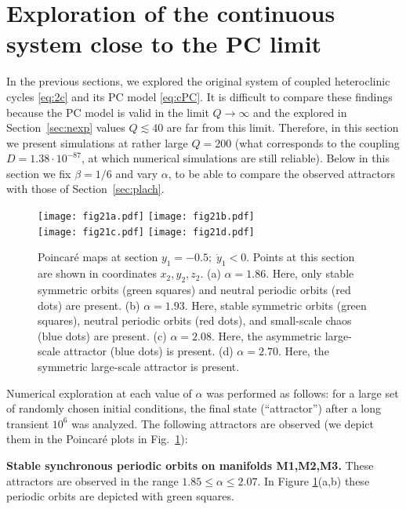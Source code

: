 \documentclass[3p,number,review,sort&compress]{elsarticle}
\begin{document}
\section{Exploration of the continuous system close to the PC limit}
\label{sec:ecl}

In the previous sections, we explored the original system of coupled heteroclinic cycles \eqref{eq:2c} and its PC model \eqref{eq:cPC}. It is difficult to compare these findings because the PC model is valid in the limit $Q\to\infty$ and
the explored in Section~\ref{sec:nexp} values $Q\lesssim 40$ are far from this limit. Therefore, in this section we present simulations at rather large $Q=200$
(what corresponds to the coupling $D=1.38\cdot 10^{-87}$, at which numerical simulations are still reliable). Below in this section we fix $\beta=1/6$ and vary $\alpha$, to be able to compare the observed attractors with those of Section~\ref{sec:plach}. 



\begin{figure}[!htb]
\centering
\texttt{[image: fig21a.pdf]}\hfill
\texttt{[image: fig21b.pdf]}\\
\texttt{[image: fig21c.pdf]}\hfill
\texttt{[image: fig21d.pdf]}
\caption{Poincar\'e maps at section $y_1=-0.5;\;\dot y_1<0$. Points at this
section are shown in coordinates $x_2,y_2,z_2$. (a) $\alpha=1.86$. Here, only stable symmetric orbits 
 (green squares) and neutral periodic orbits (red dots) are present. (b) $\alpha=1.93$. Here, stable symmetric orbits 
 (green squares), neutral periodic orbits (red dots), and
 small-scale chaos (blue dots) are present.  
 (c) $\alpha=2.08$. Here,  the asymmetric large-scale attractor (blue dots) is present. (d) $\alpha=2.70$. Here, the symmetric large-scale attractor is present.
}
\label{fig:rand1}
\end{figure}

Numerical exploration at each value of $\alpha$ was performed as follows:
for a large set of randomly chosen initial conditions,
the final state (``attractor'') after a long transient $10^6$ was analyzed. The following attractors are observed (we depict them in the Poincar\'e plots in Fig.~\ref{fig:rand1}):

\textbf{Stable synchronous periodic orbits on manifolds M1,M2,M3.} These attractors are observed 
in the range $1.85\leq \alpha \leq 2.07$. In Figure \ref{fig:rand1}(a,b)
these periodic orbits
are depicted with green squares.
\end{document}

